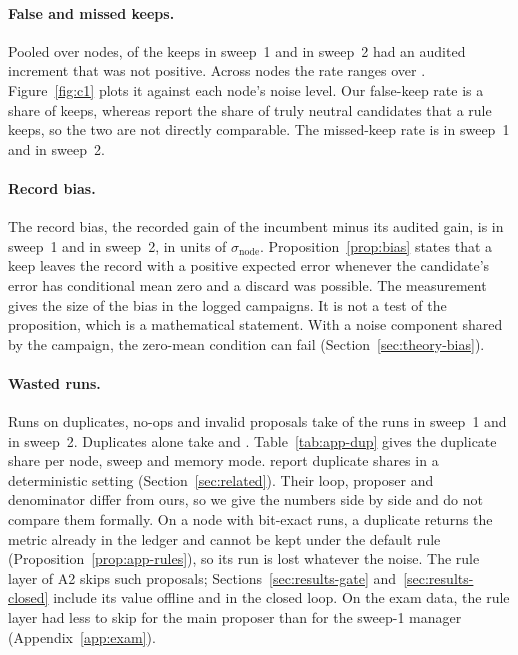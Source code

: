 \paragraph{False and missed keeps.}
Pooled over nodes, \COneFalseKeepSOne{} of the keeps in sweep~1 and \COneFalseKeepSTwo{} in sweep~2 had an audited increment that was not positive. Across nodes the rate ranges over \COneFalseKeepRange. Figure~\ref{fig:c1} plots it against each node's noise level.  Our false-keep rate is a share of keeps, whereas \citet{jalaian2026noise} report the share of truly neutral candidates that a rule keeps, so the two are not directly comparable. The missed-keep rate is \COneMissedKeepSOne{} in sweep~1 and \COneMissedKeepSTwo{} in sweep~2.

\paragraph{Record bias.}
The record bias, the recorded gain of the incumbent minus its audited gain, is \COneRecordBiasSOne{} in sweep~1 and \COneRecordBiasSTwo{} in sweep~2, in units of $\sigma_{\mathrm{node}}$. Proposition~\ref{prop:bias} states that a keep leaves the record with a positive expected error whenever the candidate's error has conditional mean zero and a discard was possible. The measurement gives the size of the bias in the logged campaigns. It is not a test of the proposition, which is a mathematical statement. With a noise component shared by the campaign, the zero-mean condition can fail (Section~\ref{sec:theory-bias}). 

\paragraph{Wasted runs.}
Runs on duplicates, no-ops and invalid proposals take \COneWastedSOne{} of the runs in sweep~1 and \COneWastedSTwo{} in sweep~2. Duplicates alone take \COneDupSOne{} and \COneDupSTwo. Table~\ref{tab:app-dup} gives the duplicate share per node, sweep and memory mode.  \citet{chen2026visible} report duplicate shares in a deterministic setting (Section~\ref{sec:related}). Their loop, proposer and denominator differ from ours, so we give the numbers side by side and do not compare them formally. On a node with bit-exact runs, a duplicate returns the metric already in the ledger and cannot be kept under the default rule (Proposition~\ref{prop:app-rules}), so its run is lost whatever the noise. The rule layer of A2 skips such proposals; Sections~\ref{sec:results-gate} and~\ref{sec:results-closed} include its value offline and in the closed loop. On the exam data, the rule layer had less to skip for the main proposer than for the sweep-1 manager (Appendix~\ref{app:exam}). 

